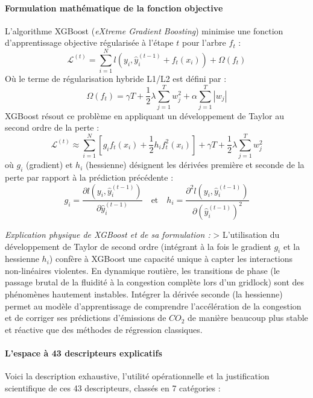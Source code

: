 \documentclass[10pt, a4paper]{article}
\begin{document}
\paragraph{Formulation mathématique de la fonction
objective}\label{formulation-mathuxe9matique-de-la-fonction-objective}

L'algorithme XGBoost (\emph{eXtreme Gradient Boosting}) minimise une
fonction d'apprentissage objective régularisée à l'étape \(t\) pour
l'arbre \(f_t\) :
\[\mathcal{L}^{(t)} = \sum_{i=1}^N l\left(y_i, \hat{y}_i^{(t-1)} + f_t(x_i)\right) + \Omega(f_t)\]
Où le terme de régularisation hybride L1/L2 est défini par :
\[\Omega(f_t) = \gamma T + \frac{1}{2} \lambda \sum_{j=1}^T w_j^2 + \alpha \sum_{j=1}^T |w_j|\]
XGBoost résout ce problème en appliquant un développement de Taylor au
second ordre de la perte :
\[\mathcal{L}^{(t)} \approx \sum_{i=1}^N \left[ g_i f_t(x_i) + \frac{1}{2} h_i f_t^2(x_i) \right] + \gamma T + \frac{1}{2} \lambda \sum_{j=1}^T w_j^2\]
où \(g_i\) (gradient) et \(h_i\) (hessienne) désignent les dérivées
première et seconde de la perte par rapport à la prédiction précédente :
\[g_i = \frac{\partial l\left(y_i, \hat{y}_i^{(t-1)}\right)}{\partial \hat{y}_i^{(t-1)}} \quad \text{et} \quad h_i = \frac{\partial^2 l\left(y_i, \hat{y}_i^{(t-1)}\right)}{\partial \left(\hat{y}_i^{(t-1)}\right)^2}\]

\emph{Explication physique de XGBoost et de sa formulation :}
\textgreater{} L'utilisation du développement de Taylor de second ordre
(intégrant à la fois le gradient \(g_i\) et la hessienne \(h_i\))
confère à XGBoost une capacité unique à capter les interactions
non-linéaires violentes. En dynamique routière, les transitions de phase
(le passage brutal de la fluidité à la congestion complète lors d'un
gridlock) sont des phénomènes hautement instables. Intégrer la dérivée
seconde (la hessienne) permet au modèle d'apprentissage de comprendre
l'accélération de la congestion et de corriger ses prédictions
d'émissions de \(CO_2\) de manière beaucoup plus stable et réactive que
des méthodes de régression classiques.

\paragraph{L'espace à 43 descripteurs
explicatifs}\label{lespace-uxe0-43-descripteurs-explicatifs}

Voici la description exhaustive, l'utilité opérationnelle et la
justification scientifique de ces 43 descripteurs, classés en 7
catégories :
\end{document}

